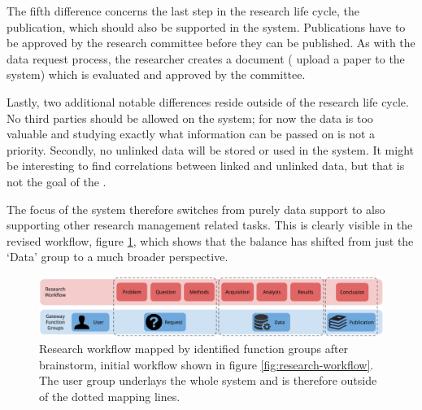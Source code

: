 The fifth difference concerns the last step in the research life cycle, the publication, which should also be supported in the system.
Publications have to be approved by the research committee before they can be published.
As with the data request process, the researcher creates a document (\ie{} upload a paper to the system) which is evaluated and approved by the committee.

Lastly, two additional notable differences reside outside of the research life cycle.
No third parties should be allowed on the system; for now the data is too valuable and studying exactly what information can be passed on is not a priority.
Secondly, no unlinked data will be stored or used in the system.
It might be interesting to find correlations between linked and unlinked data, but that is not the goal of the \project{}.

The focus of the system therefore switches from purely data support to also supporting other research management related tasks.
This is clearly visible in the revised workflow, figure \ref{fig:research-workflow-after}, which shows that the balance has shifted from just the `Data' group to a much broader perspective.

\begin{figure}[hb]
	\centering
	\includegraphics[width=1.0\linewidth]{images/research-workflow-after}
	\caption{
		Research workflow mapped by identified function groups after brainstorm, initial workflow shown in figure \ref{fig:research-workflow}.
		The user group underlays the whole system and is therefore outside of the dotted mapping lines.
	}
	\label{fig:research-workflow-after}
\end{figure}